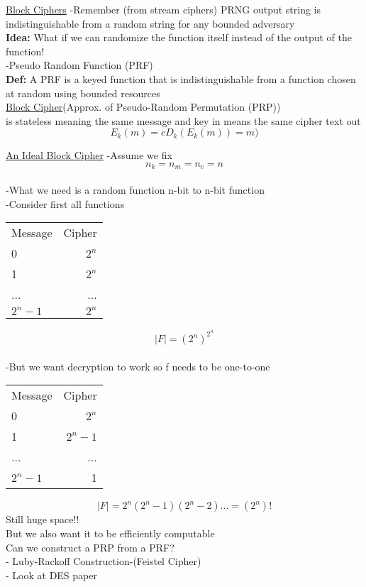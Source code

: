 \documentclass[12pt,letterpaper]{article}
\begin{document}
\underline{Block Ciphers}
-Remember (from stream ciphers) PRNG output string is indistinguishable from a random string for any bounded adversary\\

\textbf{Idea:} What if we can randomize the function itself instead of the output of the function!\\
-Pseudo Random Function (PRF)\\
\textbf{Def:} A PRF is a keyed function that is indistinguishable from a function chosen at random using bounded resources\\

\underline{Block Cipher}(Approx. of Pseudo-Random Permutation (PRP))\\
 is stateless meaning the same message and key in means the same cipher text out \[E_{k}(m)=c D_{k}(E_{k}(m))=m)\]


\underline{An Ideal Block Cipher}
-Assume we fix \[n_{k}=n_{m}=n_{c}=n\]\\
-What we need is a random function n-bit to n-bit function\\
\vspace{0.1 mm}
-Consider first all functions\\

\begin{tabular}{ l | r }
  \hline                        
  Message & Cipher \\
  0 & $2^n$ \\
  1 & $2^n$ \\
  ... & ... \\
  $2^n-1$ & $2^n$ \\
  \hline  
\end{tabular}

\[\left|{F}\right|=(2^n)^{2^n} \]\\
\vspace{0.1 mm}
-But we want decryption to work so f needs to be one-to-one\\

\begin{tabular}{ l | r }
  \hline                        
  Message & Cipher \\
  0 & $2^n$ \\
  1 & $2^n-1$ \\
  ... & ... \\
  $2^n-1$ & 1 \\
  \hline  
\end{tabular}

\[\left|{F}\right|=2^n(2^n-1)(2^n-2)...=(2^n)! \] 
Still huge space!!\\
But we also want it to be efficiently computable\\

Can we construct a PRP from a PRF?\\
- Luby-Rackoff Construction-(Feistel Cipher)\\
- Look at DES paper\\
\end{document}

